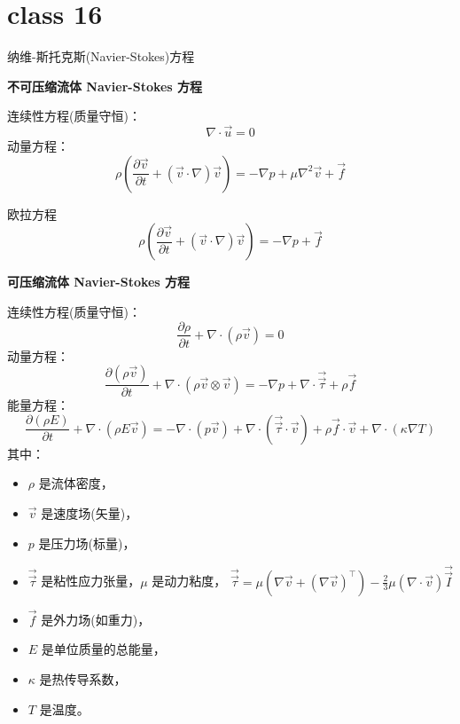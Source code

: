 \documentclass[12pt, a4paper, oneside, UTF8]{ctexbook}  %
\begin{document}
\section{class 16}
\begin{defn}
    纳维-斯托克斯(Navier-Stokes)方程
    \begin{center}
        \textbf{不可压缩流体 Navier-Stokes 方程} 
    \end{center}
    连续性方程(质量守恒)：
       \[
       \nabla \cdot \vec{u} = 0
       \]
    动量方程：
       \[
        \rho \left( \frac{\partial \vec{v}}{\partial t} + (\vec{v} \cdot \nabla) \vec{v} \right) = -\nabla p + \mu \nabla^2 \vec{v} + \vec{f}
    \]
    \begin{zhu}
    欧拉方程
    \[
        \rho \left( \frac{\partial \vec{v}}{\partial t} + (\vec{v} \cdot \nabla) \vec{v} \right) = -\nabla p  + \vec{f}
    \]
    \end{zhu}
    \begin{center}
        \textbf{可压缩流体 Navier-Stokes 方程 }
    \end{center}
连续性方程(质量守恒)：
\[
\frac{\partial \rho}{\partial t} + \nabla \cdot (\rho \vec{v}) = 0
\]
动量方程：
\[
\frac{\partial (\rho \vec{v})}{\partial t} + \nabla \cdot (\rho \vec{v} \otimes \vec{v}) = -\nabla p + \nabla \cdot \vec{\vec{\tau}} + \rho \vec{f}
\]
能量方程：
\[
\frac{\partial (\rho E)}{\partial t} + \nabla \cdot (\rho E \vec{v}) = -\nabla \cdot (p \vec{v}) 
+ \nabla \cdot (\vec{\vec{\tau}} \cdot \vec{v}) + \rho \vec{f} \cdot \vec{v} + \nabla \cdot (\kappa \nabla T)
\]
其中：
\begin{itemize}
    \item \(\rho\) 是流体密度，
    \item \(\vec{v}\) 是速度场(矢量)，
    \item \(p\) 是压力场(标量)，
    \item \(\vec{\vec{\tau}}\) 是粘性应力张量，\(\mu\) 是动力粘度，
    $\vec{\vec{\tau}} = \mu \left( \nabla \vec{v} 
    + (\nabla \vec{v})^\top \right) - \frac{2}{3} \mu (\nabla \cdot \vec{v}) \vec{\vec{I}}$
    \item \(\vec{f}\) 是外力场(如重力)，
    \item \(E\) 是单位质量的总能量，
    \item \(\kappa\) 是热传导系数，
    \item \(T\) 是温度。
\end{itemize}
\end{defn}
\end{document}
